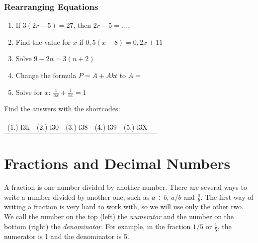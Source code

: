             \subsubsection{  Rearranging Equations }
            \nopagebreak
        \label{m38346*id176734}\begin{enumerate}[noitemsep, label=\textbf{\arabic*}. ] 
            \label{m38346*uid43}\item If $3\left(2r-5\right)=27$, then $2r-5=.....$\hspace{1ex}        \label{m38346*uid44}\item Find the value for $x$ if $0,5\left(x-8\right)=0,2x+11$\hspace{1ex}        \label{m38346*uid45}\item Solve $9-2n=3\left(n+2\right)$\hspace{1ex}        \label{m38346*uid46}\item Change the formula $P=A+Akt$ \hspace{1ex}to $A=$\hspace{1ex}        \label{m38346*uid47}\item Solve for $x$: $\frac{1}{ax}+\frac{1}{bx}=1$\hspace{1ex}        \end{enumerate}
\par {} Find the answers with the shortcodes:
 \par \begin{tabular}[h]{cccccc}
 (1.) l3k  &  (2.) l30  &  (3.) l38  &  (4.) l39  &  (5.) l3X  & \end{tabular}
    \section{Fractions and Decimal Numbers}
            \nopagebreak
      \label{m38346*id177025}A fraction is one number divided by another number. There are several ways to
write a number divided by another one, such as $a÷b$, $a/b$ and $\frac{a}{b}$.
The first way of writing a fraction is very hard to work with, so we will use
only the other two. We call the number on the top (left) the \textsl{numerator} and
the number on the bottom (right) the \textsl{denominator}. For example, in the fraction
$1/5$ or $\frac{1}{5}$, the numerator is 1 and the denominator is 5.\par 
\label{m38346*secfhsst!!!underscore!!!id1752}

